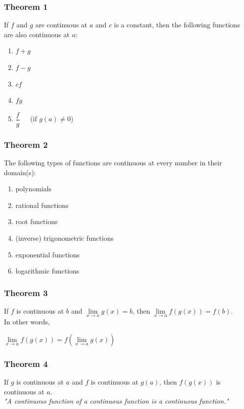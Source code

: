 \documentclass{beamer}
\begin{document}
	\begin{frame}
		\frametitle{Theorem 1}
		If $f$ and $g$ are continuous at $a$ and $c$ is a constant, then the following functions are also continuous at $a$:
		\begin{enumerate}
			\item $f + g$
			\item $f - g$
			\item $cf$
			\item $fg$
			\item $\dfrac{f}{g}$\ \ \ \alert{(if $g(a) \neq 0$)}
		\end{enumerate}
	\end{frame}
	\begin{frame}
		\frametitle{Theorem 2}
		The following types of functions are continuous at every number in their domain(s):
		\begin{enumerate}
			\item polynomials
			\item rational functions
			\item root functions
			\item (inverse) trigonometric functions
			\item exponential functions
			\item logarithmic functions
		\end{enumerate}
	\end{frame}
	\begin{frame}
		\frametitle{Theorem 3}
		If $f$ is continuous at $b$ and $\lim\limits_{\textit{x} \to a}g(x) = b$, then $\lim\limits_{\textit{x} \to a}f(g(x))=f(b)$.\\
		\bigskip
		In other words,
		\begin{center}
			$\lim\limits_{\textit{x} \to a}f(g(x))=f(\lim\limits_{\textit{x} \to a}g(x))$
		\end{center}
	\end{frame}
	\begin{frame}
		\frametitle{Theorem 4}
		If $g$ is continuous at $a$ and $f$ is continuous at $g(a)$, then $f(g(x))$ is continuous at $a$.\\
		\bigskip
		\bigskip
		\textit{"A continuous function of a continuous function is a continuous function."}
	\end{frame}
\end{document}
